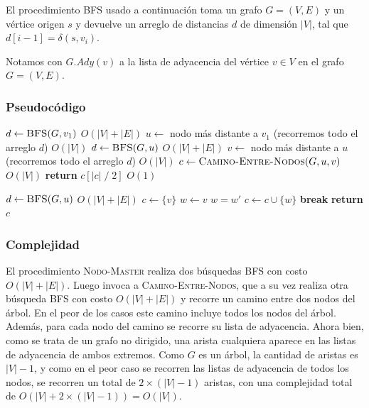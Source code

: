 \documentclass[a4paper, 10pt, twoside]{article}
\newenvironment{pseudo}[1][]{%
    \vspace{1em}%
    \begin{algorithmic}%
}
{%
    \end{algorithmic}%
    \vspace{1em}%
}
\newcommand{\In}{\textbf{in} }
\newcommand{\Break}{\State \textbf{break}}
\newcommand{\PReturn}{\State \textbf{return} }
\newcommand{\Ode}[1]{\hfill $O(#1)$}
\begin{document}
El procedimiento BFS usado a continuación toma un grafo $G = (V, E)$ y un vértice origen $s$ y devuelve un arreglo de distancias $d$ de dimensión $|V|$, tal que $d[i - 1] = \delta(s, v_i)$.

Notamos con $G.Ady(v)$ a la lista de adyacencia del vértice $v \in V$ en el grafo $G = (V, E)$.


\subsubsection{Pseudocódigo}

\begin{pseudo}
    \State $d \leftarrow \textsc{BFS}(G, v_1)$                                         \Ode{|V| + |E|}
    \State $u \leftarrow$ nodo más distante a $v_1$ (recorremos todo el arreglo $d$)   \Ode{|V|}
    \State $d \leftarrow \textsc{BFS}(G, u)$                                           \Ode{|V| + |E|}
    \State $v \leftarrow$ nodo más distante a $u$ (recorremos todo el arreglo $d$)     \Ode{|V|}
    \State $c \leftarrow \textsc{Camino-Entre-Nodos}(G, u, v)$                         \Ode{|V|}
    \PReturn $c[|c|\; /\; 2]$                                                          \Ode{1}
  \EndProcedure

  \State

    \State $d \leftarrow \textsc{BFS}(G, u)$                                           \Ode{|V| + |E|}
    \State $c \leftarrow \{ v \}$ 
    \State $w \leftarrow v$ 
     
      \For{$w'$ \In $G.Ady(w)$} 
         
          \State $w = w'$
          \State $c \leftarrow c \cup \{ w \}$ 
          \Break
        \EndIf
      \EndFor
    \EndWhile
    \PReturn $c$
  \EndProcedure
\end{pseudo}


\subsubsection{Complejidad}

El procedimiento \textsc{Nodo-Master} realiza dos búsquedas BFS con costo $O(|V| + |E|)$. Luego invoca a \textsc{Camino-Entre-Nodos}, que a su vez realiza otra búsqueda BFS con costo $O(|V| + |E|)$ y recorre un camino entre dos nodos del árbol. En el peor de los casos este camino incluye todos los nodos del árbol. Además, para cada nodo del camino se recorre su lista de adyacencia. Ahora bien, como se trata de un grafo no dirigido, una arista cualquiera aparece en las listas de adyacencia de ambos extremos. Como $G$ es un árbol, la cantidad de aristas es $|V| - 1$, y como en el peor caso se recorren las listas de adyacencia de todos los nodos, se recorren un total de $2 \times (|V| - 1)$ aristas, con una complejidad total de $O(|V| + 2 \times (|V| - 1)) = O(|V|)$.
\end{document}
